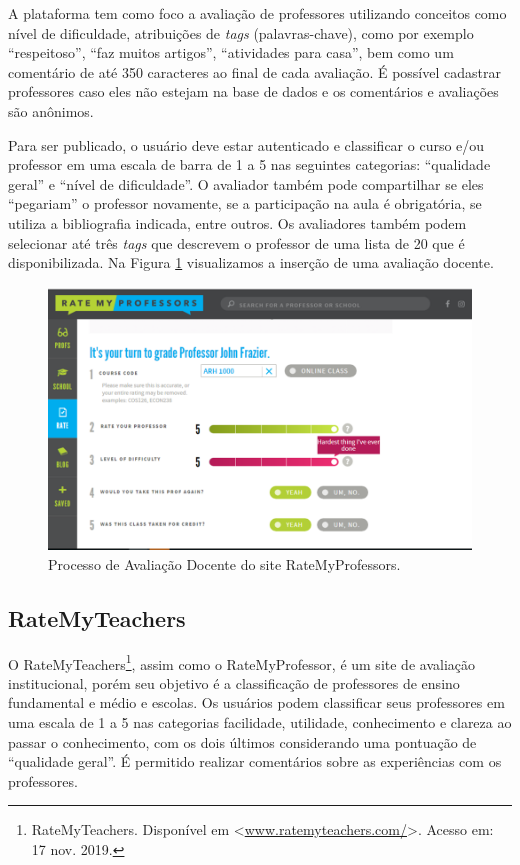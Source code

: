 \documentclass[12pt, a4paper]{report}
\begin{document}
A plataforma tem como foco a avaliação de professores utilizando conceitos como nível de dificuldade, atribuições de \textit{tags} (palavras-chave), como por exemplo ``respeitoso'', ``faz muitos artigos'', ``atividades para casa'', bem como um comentário de até 350 caracteres ao final de cada avaliação. É possível cadastrar professores caso eles não estejam na base de dados e os comentários e avaliações são anônimos.

Para ser publicado, o usuário deve estar autenticado e classificar o curso e/ou professor em uma escala de barra de 1 a 5 nas seguintes categorias: ``qualidade geral'' e ``nível de dificuldade''. O avaliador também pode compartilhar se eles ``pegariam'' o professor novamente, se a participação na aula é obrigatória, se utiliza a bibliografia indicada, entre outros. Os avaliadores também podem selecionar até três \textit{tags} que descrevem o professor de uma lista de 20 que é disponibilizada. Na Figura \ref{fig:ratemyprofessor} visualizamos a inserção de uma avaliação docente.

\begin{figure}
\centering
\includegraphics[scale=0.45]{ratemyprofessor.png}
\caption{Processo de Avaliação Docente do site RateMyProfessors.}
\label{fig:ratemyprofessor}
\end{figure}

\subsection{RateMyTeachers}

O RateMyTeachers\footnote{RateMyTeachers. Disponível em <\url{www.ratemyteachers.com/}>. Acesso em: 17 nov. 2019.}, assim como o RateMyProfessor, é um site de avaliação institucional, porém seu objetivo é a classificação de professores de ensino fundamental e médio e escolas. Os usuários podem classificar seus professores em uma escala de 1 a 5 nas categorias facilidade, utilidade, conhecimento e clareza ao passar o conhecimento, com os dois últimos considerando uma pontuação de ``qualidade geral''. É permitido realizar comentários sobre as experiências com os professores.
\end{document}
